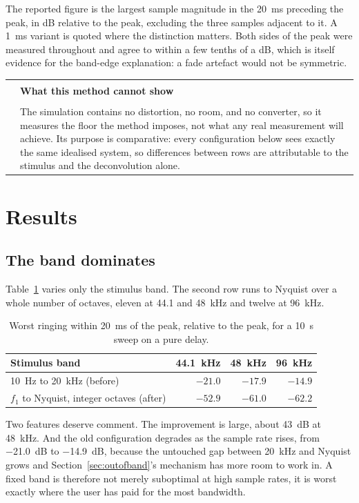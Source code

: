 \documentclass[11pt,a4paper]{article}
\makeatletter
\newenvironment{remark}[1]
  {\par\medskip\noindent\begin{tabular}{@{}p{0.03\textwidth}p{0.93\textwidth}@{}}
   \textcolor{smtblue}{\rule{2pt}{\baselineskip}} & \textbf{#1}\\[2pt] & \ignorespaces}
  {\end{tabular}\par\medskip}
\makeatother
\begin{document}
The reported figure is the largest sample magnitude in the \SI{20}{\milli\second}
preceding the peak, in dB relative to the peak, excluding the three samples
adjacent to it. A \SI{1}{\milli\second} variant is quoted where the distinction
matters. Both sides of the peak were measured throughout and agree to within a
few tenths of a dB, which is itself evidence for the band-edge explanation:
a fade artefact would not be symmetric.

\begin{remark}{What this method cannot show}
The simulation contains no distortion, no room, and no converter, so it measures
the floor the method imposes, not what any real measurement will achieve. Its
purpose is comparative: every configuration below sees exactly the same
idealised system, so differences between rows are attributable to the stimulus
and the deconvolution alone.
\end{remark}

\section{Results}

\subsection{The band dominates}

Table~\ref{tab:band} varies only the stimulus band. The second row runs to
Nyquist over a whole number of octaves, eleven at \SI{44.1}{} and
\SI{48}{\kilo\hertz} and twelve at \SI{96}{\kilo\hertz}.

\begin{table}[h]
\centering
\caption{Worst ringing within \SI{20}{\milli\second} of the peak, relative to the
peak, for a \SI{10}{\second} sweep on a pure delay.}
\label{tab:band}
\begin{tabular}{lrrr}
\toprule
Stimulus band & \SI{44.1}{\kilo\hertz} & \SI{48}{\kilo\hertz} & \SI{96}{\kilo\hertz} \\
\midrule
\SI{10}{\hertz} to \SI{20}{\kilo\hertz} (before)   & $-21.0$ & $-17.9$ & $-14.9$ \\
$f_1$ to Nyquist, integer octaves (after)          & $-52.9$ & $-61.0$ & $-62.2$ \\
\bottomrule
\end{tabular}
\end{table}

Two features deserve comment. The improvement is large, about \SI{43}{\dB} at
\SI{48}{\kilo\hertz}. And the old configuration degrades as the sample rate
rises, from \SI{-21.0}{\dB} to \SI{-14.9}{\dB}, because the untouched gap
between \SI{20}{\kilo\hertz} and Nyquist grows and Section~\ref{sec:outofband}'s
mechanism has more room to work in. A fixed band is therefore not merely
suboptimal at high sample rates, it is worst exactly where the user has paid for
the most bandwidth.
\end{document}
